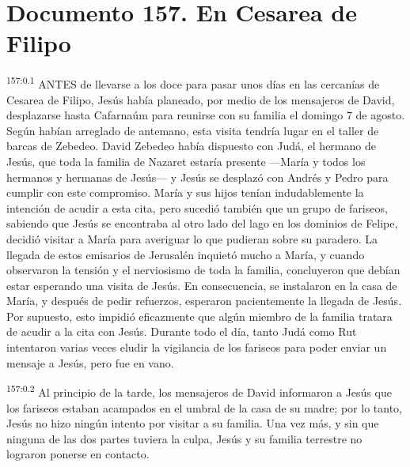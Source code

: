 \chapter{Documento 157. En Cesarea de Filipo}
\par 
\textsuperscript{157:0.1} ANTES de llevarse a los doce para pasar unos días en las cercanías de Cesarea de Filipo, Jesús había planeado, por medio de los mensajeros de David, desplazarse hasta Cafarnaúm para reunirse con su familia el domingo 7 de agosto. Según habían arreglado de antemano, esta visita tendría lugar en el taller de barcas de Zebedeo. David Zebedeo había dispuesto con Judá, el hermano de Jesús, que toda la familia de Nazaret estaría presente ---María y todos los hermanos y hermanas de Jesús--- y Jesús se desplazó con Andrés y Pedro para cumplir con este compromiso. María y sus hijos tenían indudablemente la intención de acudir a esta cita, pero sucedió también que un grupo de fariseos, sabiendo que Jesús se encontraba al otro lado del lago en los dominios de Felipe, decidió visitar a María para averiguar lo que pudieran sobre su paradero. La llegada de estos emisarios de Jerusalén inquietó mucho a María, y cuando observaron la tensión y el nerviosismo de toda la familia, concluyeron que debían estar esperando una visita de Jesús. En consecuencia, se instalaron en la casa de María, y después de pedir refuerzos, esperaron pacientemente la llegada de Jesús. Por supuesto, esto impidió eficazmente que algún miembro de la familia tratara de acudir a la cita con Jesús. Durante todo el día, tanto Judá como Rut intentaron varias veces eludir la vigilancia de los fariseos para poder enviar un mensaje a Jesús, pero fue en vano.

\par 
\textsuperscript{157:0.2} Al principio de la tarde, los mensajeros de David informaron a Jesús que los fariseos estaban acampados en el umbral de la casa de su madre; por lo tanto, Jesús no hizo ningún intento por visitar a su familia. Una vez más, y sin que ninguna de las dos partes tuviera la culpa, Jesús y su familia terrestre no lograron ponerse en contacto.

